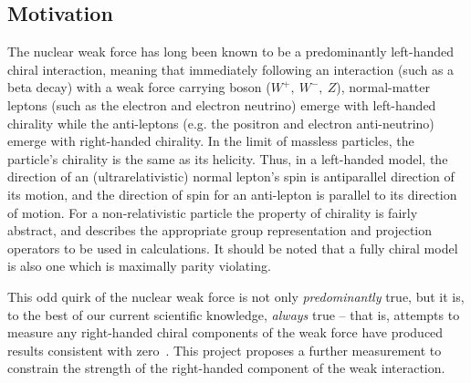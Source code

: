 \subsection{Motivation}
\label{motivation}

The nuclear weak force has long been known to be a predominantly left-handed chiral interaction, meaning that immediately following an interaction (such as a beta decay) with a weak force carrying boson ($W^+,\: W^-,\: Z$), 
normal-matter leptons (such as the electron and electron neutrino) emerge with left-handed chirality
while the anti-leptons (e.g. the positron and electron anti-neutrino) emerge with right-handed chirality.  
In the limit of massless particles, the particle's chirality is the same as its helicity. Thus, in a left-handed model, the direction of an (ultrarelativistic) normal lepton's spin is antiparallel direction of its motion, and the direction of spin for an anti-lepton is parallel to its direction of motion.  For a non-relativistic particle the property of chirality is fairly abstract, and describes the appropriate group representation and projection operators to be used in calculations.  It should be noted that a fully chiral model is also one which is maximally parity violating.

This odd quirk of the nuclear weak force is not only \emph{predominantly} true, but it is, to the best of our current scientific knowledge, \emph{always} true -- that is, attempts to measure any right-handed chiral components of the weak force have produced results consistent with zero~\cite{severijns_beck_cuncic_2006}\cite{severijns_cuncic_2011}.  This project proposes a further measurement to constrain the strength of the right-handed component of the weak interaction.  

%

